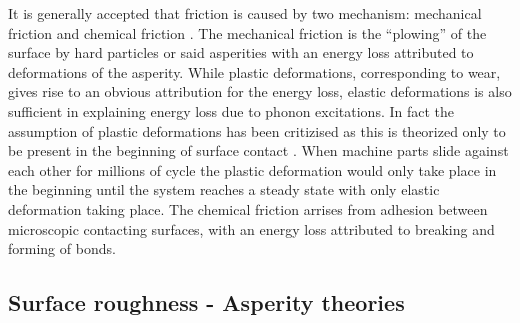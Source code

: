 It is generally accepted that friction is caused by two mechanism: mechanical
friction and chemical friction \cite{kim_nano-scale_2009}. The mechanical
friction is the ``plowing'' of the surface by hard particles or said asperities
with an energy loss attributed to deformations of the asperity. While plastic
deformations, corresponding to wear, gives rise to an obvious attribution for
the energy loss, elastic deformations is also sufficient in explaining energy
loss due to phonon excitations. In fact the assumption of plastic deformations
has been critizised as this is theorized only to be present in the beginning of
surface contact \cite{CARBONE20082555}. When machine parts slide against each
other for millions of cycle the plastic deformation would only take place in the
beginning until the system reaches a steady state with only elastic deformation
taking place. The chemical friction arrises from adhesion between microscopic
contacting surfaces, with an energy loss attributed to breaking and forming of
bonds. 







\subsection{Surface roughness - Asperity theories}

